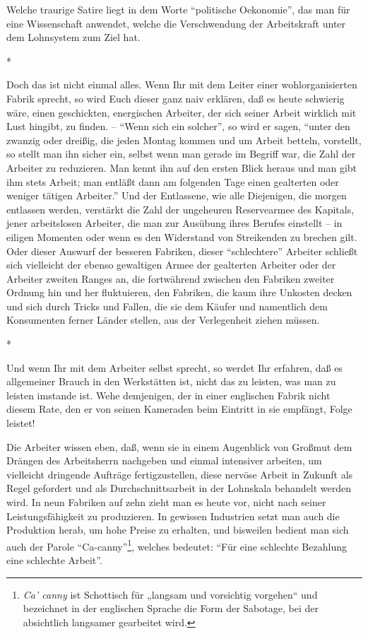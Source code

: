 \documentclass{scrbook}
\begin{document}
Welche traurige Satire liegt in dem Worte ``politische Oekonomie'', das man für eine Wissenschaft anwendet, welche die Verschwendung der Arbeitskraft unter dem Lohnsystem zum Ziel hat.

\begin{center}*\end{center}

Doch das ist nicht einmal alles. Wenn Ihr mit dem Leiter einer wohlorganisierten Fabrik sprecht, so wird Euch dieser ganz naiv erklären, daß es heute schwierig wäre, einen geschickten, energischen Arbeiter, der sich seiner Arbeit wirklich mit Lust hingibt, zu finden. – ``Wenn sich ein solcher'', so wird er sagen, ``unter den zwanzig oder dreißig, die jeden Montag kommen und um Arbeit betteln, vorstellt, so stellt man ihn sicher ein, selbst wenn man gerade im Begriff war, die Zahl der Arbeiter zu reduzieren. Man kennt ihn auf den ersten Blick heraus und man gibt ihm stets Arbeit; man entläßt dann am folgenden Tage einen gealterten oder weniger tätigen Arbeiter.'' Und der Entlassene, wie alle Diejenigen, die morgen entlassen werden, verstärkt die Zahl der ungeheuren Reservearmee des Kapitals, jener arbeitslosen Arbeiter, die man zur Ausübung ihres Berufes einstellt – in eiligen Momenten oder wenn es den Widerstand von Streikenden zu brechen gilt. Oder dieser Auswurf der besseren Fabriken, dieser ``schlechtere'' Arbeiter schließt sich vielleicht der ebenso gewaltigen Armee der gealterten Arbeiter oder der Arbeiter zweiten Ranges an, die fortwährend zwischen den Fabriken zweiter Ordnung hin und her fluktuieren, den Fabriken, die kaum ihre Unkosten decken und sich durch Tricks und Fallen, die sie dem Käufer und namentlich dem Konsumenten ferner Länder stellen, aus der Verlegenheit ziehen müssen.

\begin{center}*\end{center}

Und wenn Ihr mit dem Arbeiter selbst sprecht, so werdet Ihr erfahren, daß es allgemeiner Brauch in den Werkstätten ist, nicht das zu leisten, was man zu leisten imstande ist. Wehe demjenigen, der in einer englischen Fabrik nicht diesem Rate, den er von seinen Kameraden beim Eintritt in sie empfängt, Folge leistet!

Die Arbeiter wissen eben, daß, wenn sie in einem Augenblick von Großmut dem Drängen des Arbeitsherrn nachgeben und einmal intensiver arbeiten, um vielleicht dringende Aufträge fertigzustellen, diese nervöse Arbeit in Zukunft als Regel gefordert und als Durchschnittsarbeit in der Lohnskala behandelt werden wird. In neun Fabriken auf zehn zieht man es heute vor, nicht nach seiner Leistungsfähigkeit zu produzieren. In gewissen Industrien setzt man auch die Produktion herab, um hohe Preise zu erhalten, und bisweilen bedient man sich auch der Parole ``Ca-canny''\footnote{\textit{Ca’ canny} ist Schottisch für „langsam und vorsichtig vorgehen“ und bezeichnet in der englischen Sprache die Form der Sabotage, bei der absichtlich langsamer gearbeitet wird.}, welches bedeutet: ``Für eine schlechte Bezahlung eine schlechte Arbeit''.
\end{document}
